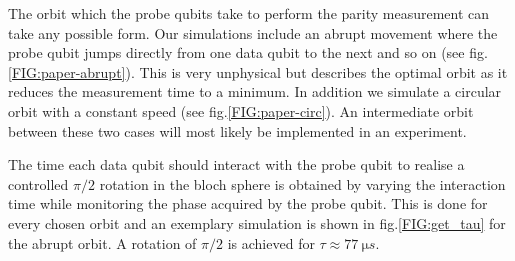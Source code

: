 The orbit which the probe qubits take to perform the parity measurement can take any possible form. Our simulations include an abrupt movement where the probe qubit jumps directly from one data qubit to the next and so on (see fig.\@ \ref{FIG:paper-abrupt}). This is very unphysical but describes the optimal orbit as it reduces the measurement time to a minimum. In addition we simulate a circular orbit with a constant speed (see fig.\@ \ref{FIG:paper-circ}). An intermediate orbit between these two cases will most likely be implemented in an experiment. 

The time each data qubit should interact with the probe qubit to realise a controlled $\pi/2$ rotation in the bloch sphere is obtained by varying the interaction time while monitoring the phase acquired by the probe qubit. This is done for every chosen orbit and an exemplary simulation is shown in fig.\@ \ref{FIG:get_tau} for the abrupt orbit. A rotation of $\pi/2$ is achieved for $\tau\approx \SI{77}{\micro s}$.


